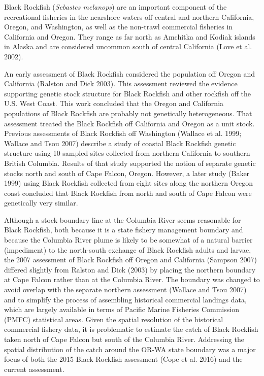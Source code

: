 \documentclass[11pt,
  letterpaper,
]{article}
\begin{document}
Black Rockfish (\emph{Sebastes melanops}) are an important component of the recreational fisheries in the nearshore waters off central and northern California, Oregon, and Washington, as well as the non-trawl commercial fisheries in California and Oregon. They range as far north as Amchitka and Kodiak islands in Alaska and are considered uncommon south of central California (Love et al. 2002).

An early assessment of Black Rockfish considered the population off Oregon and California (Ralston and Dick 2003). This assessment reviewed the evidence supporting genetic stock structure for Black Rockfish and other rockfish off the U.S. West Coast. This work concluded that the Oregon and California populations of Black Rockfish are probably not genetically heterogeneous. That assessment treated the Black Rockfish off California and Oregon as a unit stock. Previous assessments of Black Rockfish off Washington (Wallace et al. 1999; Wallace and Tsou 2007) describe a study of coastal Black Rockfish genetic structure using 10 sampled sites collected from northern California to southern British Columbia. Results of that study supported the notion of separate genetic stocks north and south of Cape Falcon, Oregon. However, a later study (Baker 1999) using Black Rockfish collected from eight sites along the northern Oregon coast concluded that Black Rockfish from north and south of Cape Falcon were genetically very similar.

Although a stock boundary line at the Columbia River seems reasonable for Black Rockfish, both because it is a state fishery management boundary and because the Columbia River plume is likely to be somewhat of a natural barrier (impediment) to the north-south exchange of Black Rockfish adults and larvae, the 2007 assessment of Black Rockfish off Oregon and California (Sampson 2007) differed slightly from Ralston and Dick (2003) by placing the northern boundary at Cape Falcon rather than at the Columbia River. The boundary was changed to avoid overlap with the separate northern assessment (Wallace and Tsou 2007) and to simplify the process of assembling historical commercial landings data, which are largely available in terms of Pacific Marine Fisheries Commission (PMFC) statistical areas. Given the spatial resolution of the historical commercial fishery data, it is problematic to estimate the catch of Black Rockfish taken north of Cape Falcon but south of the Columbia River. Addressing the spatial distribution of the catch around the OR-WA state boundary was a major focus of both the 2015 Black Rockfish assessment (Cope et al. 2016) and the current assessment.
\end{document}
